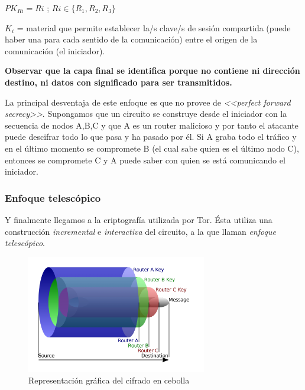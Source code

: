 \documentclass[a4paper, 11pt, titlepage]{article}
\begin{document}
            $PK_{R i} = Ri$ ; $Ri \in \{R_{1},R_{2},R_{3}\}$ 

            $K_{i}$ = material que permite establecer la/s clave/s de sesión compartida (puede haber una para cada sentido 
            de la comunicación) entre el origen de la comunicación (el iniciador).
            
            \textbf{Observar que la capa final se identifica porque no contiene ni dirección destino, ni datos con 
            significado para ser transmitidos.}

            La principal desventaja de este enfoque es que no provee de \emph{<<perfect forward secrecy>>}. Supongamos que 
            un circuito se construye desde el iniciador con la secuencia de nodos A,B,C y que A es un router malicioso y 
            por tanto el atacante puede descifrar todo lo que pasa y ha pasado por él. Si A graba todo el tráfico y en el 
            último momento se compromete B (el cual sabe quien es el último nodo C), entonces se compromete C y A puede 
            saber con quien se está comunicando el iniciador.

        \subsubsection{Enfoque telescópico}
           
            Y finalmente llegamos a la criptografía utilizada por Tor. Ésta utiliza una construcción \emph{incremental} 
            e \emph{interactiva} del circuito, a la que llaman \emph{enfoque telescópico}.
            
            \begin{figure}[htp]
                \centering
                \includegraphics[width=0.7\textwidth]{resources/onion.png}
                \caption{Representación gráfica del cifrado en cebolla}
                \label{}
            \end{figure}
\end{document}
